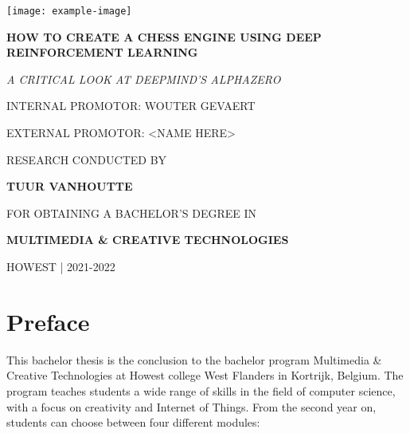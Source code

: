\documentclass{article}
\begin{document}
\begin{titlepage}
    \begin{center}
        \texttt{[image: example-image]}
    \end{center}
    \begin{adjustwidth}{1.5cm}{1.5cm}

    \vspace{0.5em}

    \MakeUppercase{\Huge\textbf{How to create a chess engine using Deep Reinforcement Learning}}

    \MakeUppercase{\Large\textit{A critical look at DeepMind's AlphaZero}}

    \vspace{1em}

    \MakeUppercase{Internal promotor: Wouter Gevaert}

    \MakeUppercase{External promotor: <name here>}

    \vspace{1em}

    \MakeUppercase{\small{Research conducted by}}

    \MakeUppercase{\Large\textbf{{Tuur Vanhoutte}}}

    \MakeUppercase{\small{for obtaining a bachelor's degree in}}

    \MakeUppercase{\Large{\textbf{{Multimedia \& Creative Technologies}}}}

    \MakeUppercase{Howest | 2021-2022}
    \end{adjustwidth}
\end{titlepage}


\newpage
\thispagestyle{empty}
\mbox{}
\newpage

\thispagestyle{empty}
\section*{Preface}

This bachelor thesis is the conclusion to the bachelor program Multimedia \& Creative Technologies at Howest college
West Flanders in Kortrijk, Belgium. The program teaches students a wide range of skills in the field of 
computer science, with a focus on creativity and Internet of Things. From the second year on, students can choose 
between four different modules:
\end{document}
